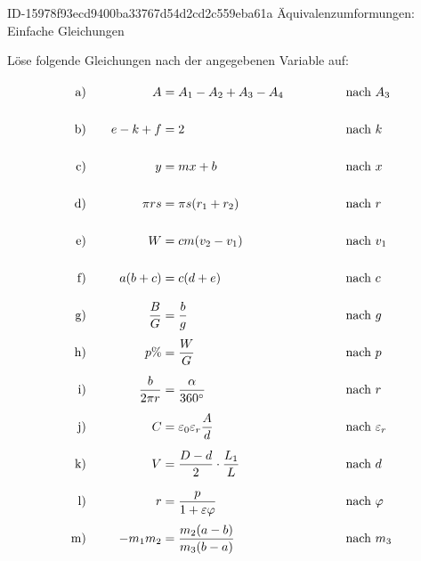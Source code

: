 \begin{exercise}
      {ID-15978f93ecd9400ba33767d54d2cd2c559eba61a}
      {Äquivalenzumformungen: Einfache Gleichungen}
  \ifproblem\problem\par
    \newcommand{\exnum}[1]{\text{\rule[-2.5ex]{0pt}{6ex}#1}}
    Löse folgende Gleichungen nach der angegebenen Variable auf:
    \allowdisplaybreaks
    \begin{alignat*}{4}
      \exnum{a)}&\quad &                A&=A_{1}-A_{2}+A_{3}-A_{4}                   & \quad&\quad & \quad&\text{nach $A_{3}$}           \\
      \exnum{b)}&\quad &            e-k+f&=2                                         & \quad&\quad & \quad&\text{nach $k$}               \\
      \exnum{c)}&\quad &                y&=mx+b                                      & \quad&\quad & \quad&\text{nach $x$}               \\
      \exnum{d)}&\quad &           \pi rs&=\pi s(r_{1}+r_{2})                        & \quad&\quad & \quad&\text{nach $r$}               \\
      \exnum{e)}&\quad &                W&=cm(v_{2}-v_{1})                           & \quad&\quad & \quad&\text{nach $v_{1}$}           \\
      \exnum{f)}&\quad &           a(b+c)&=c(d+e)                                    & \quad&\quad & \quad&\text{nach $c$}               \\
      \exnum{g)}&\quad &      \frac{B}{G}&=\frac{b}{g}                               & \quad&\quad & \quad&\text{nach $g$}               \\
      \exnum{h)}&\quad &              p\%&=\frac{W}{G}                               & \quad&\quad & \quad&\text{nach $p$}               \\
      \exnum{i)}&\quad & \frac{b}{2\pi r}&=\frac{\alpha}{360^{\circ}}                & \quad&\quad & \quad&\text{nach $r$}               \\
      \exnum{j)}&\quad &                C&=\varepsilon_{0}\varepsilon_{r}\frac{A}{d} & \quad&\quad & \quad&\text{nach $\varepsilon_{r}$} \\
      \exnum{k)}&\quad &                V&=\frac{D-d}{2}\cdot\frac{L_{1}}{L}         & \quad&\quad & \quad&\text{nach $d$}               \\
      \exnum{l)}&\quad &                r&=\frac{p}{1+\varepsilon\varphi}            & \quad&\quad & \quad&\text{nach $\varphi$}         \\
      \exnum{m)}&\quad &      -m_{1}m_{2}&=\frac{m_{2}(a-b)}{m_{3}(b-a)}             & \quad&\quad & \quad&\text{nach $m_{3}$}
    \end{alignat*}
  \fi
\end{exercise}
